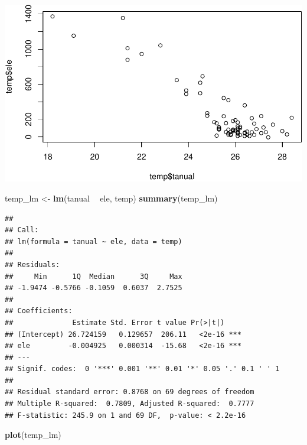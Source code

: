 \documentclass[11pt,]{article}
\newenvironment{Shaded}{\begin{snugshade}}{\end{snugshade}}
\newcommand{\KeywordTok}[1]{\textcolor[rgb]{0.13,0.29,0.53}{\textbf{#1}}}
\newcommand{\StringTok}[1]{\textcolor[rgb]{0.31,0.60,0.02}{#1}}
\newcommand{\OperatorTok}[1]{\textcolor[rgb]{0.81,0.36,0.00}{\textbf{#1}}}
\newcommand{\NormalTok}[1]{#1}
\begin{document}
\includegraphics[width=600px]{Proyecto-Precipitaciones_files/figure-latex/agregar-y-modelo-1}

\begin{Shaded}
\begin{Highlighting}[]
\NormalTok{temp_lm <-}\StringTok{ }\KeywordTok{lm}\NormalTok{(tanual }\OperatorTok{~}\StringTok{ }\NormalTok{ele, temp)}
\KeywordTok{summary}\NormalTok{(temp_lm)}
\end{Highlighting}
\end{Shaded}

\begin{verbatim}
## 
## Call:
## lm(formula = tanual ~ ele, data = temp)
## 
## Residuals:
##     Min      1Q  Median      3Q     Max 
## -1.9474 -0.5766 -0.1059  0.6037  2.7525 
## 
## Coefficients:
##              Estimate Std. Error t value Pr(>|t|)    
## (Intercept) 26.724159   0.129657  206.11   <2e-16 ***
## ele         -0.004925   0.000314  -15.68   <2e-16 ***
## ---
## Signif. codes:  0 '***' 0.001 '**' 0.01 '*' 0.05 '.' 0.1 ' ' 1
## 
## Residual standard error: 0.8768 on 69 degrees of freedom
## Multiple R-squared:  0.7809, Adjusted R-squared:  0.7777 
## F-statistic: 245.9 on 1 and 69 DF,  p-value: < 2.2e-16
\end{verbatim}

\begin{Shaded}
\begin{Highlighting}[]
\KeywordTok{plot}\NormalTok{(temp_lm)}
\end{Highlighting}
\end{Shaded}
\end{document}
